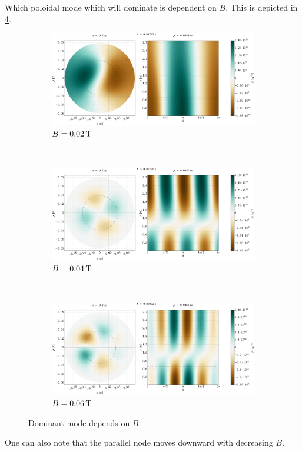 %
Which poloidal mode which will dominate is dependent on $B$.
This is depicted in \cref{fig:dominatingMode}.
%
\begin{figure}[htbp]
    \centering
    \begin{subfigure}[h]{1.00\textwidth}
        \centering
        \includegraphics[width=1.0\textwidth]{fig/results/modesDiffScanVals/B002}
        \caption{$B=0.02 \, \text{T}$}
        \label{fig:B002}
    \end{subfigure}%
    \\
    \begin{subfigure}[h]{1.00\textwidth}
        \centering
        \includegraphics[width=1.0\textwidth]{fig/results/modesDiffScanVals/B004}
        \caption{$B=0.04 \, \text{T}$}
        \label{fig:B004}
    \end{subfigure}
    \\
    \begin{subfigure}[h]{1.00\textwidth}
        \centering
        \includegraphics[width=1.0\textwidth]{fig/results/modesDiffScanVals/B006}
        \caption{$B=0.06 \, \text{T}$}
        \label{fig:B006}
    \end{subfigure}
    \caption{Dominant mode depends on $B$}
    \label{fig:dominatingMode}
\end{figure}
%
One can also note that the parallel node moves downward with decreasing $B$.

